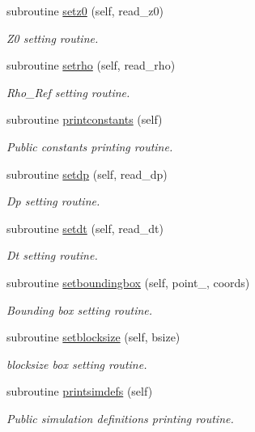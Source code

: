 \begin{DoxyCompactItemize}
subroutine \mbox{\hyperlink{namespacesimulation__globals__mod_a64b1d91147c1cd5898fec8f23d56a65d}{setz0}} (self, read\+\_\+z0)
\begin{DoxyCompactList}\small\item\em Z0 setting routine. \end{DoxyCompactList}\item 
subroutine \mbox{\hyperlink{namespacesimulation__globals__mod_a68a87c39cf88bad353e28e367a721ed4}{setrho}} (self, read\+\_\+rho)
\begin{DoxyCompactList}\small\item\em Rho\+\_\+\+Ref setting routine. \end{DoxyCompactList}\item 
subroutine \mbox{\hyperlink{namespacesimulation__globals__mod_a20ba28d72a9bea823d9373a94f97026e}{printconstants}} (self)
\begin{DoxyCompactList}\small\item\em Public constants printing routine. \end{DoxyCompactList}\item 
subroutine \mbox{\hyperlink{namespacesimulation__globals__mod_acb8e3762572266b40a0deb166dded33a}{setdp}} (self, read\+\_\+dp)
\begin{DoxyCompactList}\small\item\em Dp setting routine. \end{DoxyCompactList}\item 
subroutine \mbox{\hyperlink{namespacesimulation__globals__mod_aecf75eeccef4eeae6d10ab26cf2dcfcf}{setdt}} (self, read\+\_\+dt)
\begin{DoxyCompactList}\small\item\em Dt setting routine. \end{DoxyCompactList}\item 
subroutine \mbox{\hyperlink{namespacesimulation__globals__mod_a412b0779703630189e2ea14e4b390864}{setboundingbox}} (self, point\+\_\+, coords)
\begin{DoxyCompactList}\small\item\em Bounding box setting routine. \end{DoxyCompactList}\item 
subroutine \mbox{\hyperlink{namespacesimulation__globals__mod_aa65b43534d2d2b6366a4ebc791194805}{setblocksize}} (self, bsize)
\begin{DoxyCompactList}\small\item\em blocksize box setting routine. \end{DoxyCompactList}\item 
subroutine \mbox{\hyperlink{namespacesimulation__globals__mod_ad331ccf019de7ed531e37c655600f90f}{printsimdefs}} (self)
\begin{DoxyCompactList}\small\item\em Public simulation definitions printing routine. \end{DoxyCompactList}\end{DoxyCompactItemize}
